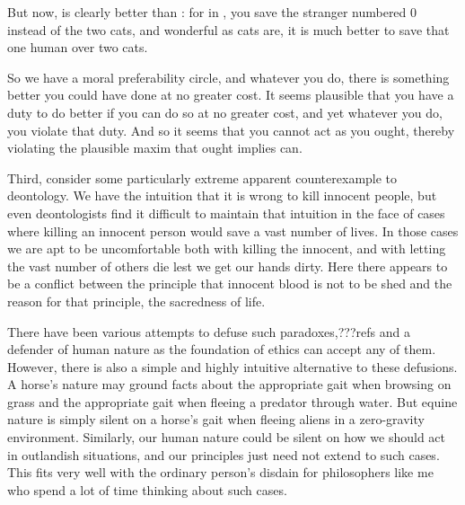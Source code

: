 But now,  is clearly better than : for in , you save the stranger
numbered $0$ instead of the two cats, and wonderful as cats are, it is much better to save that one human over two cats. 

So we have a moral preferability circle, and whatever you do, there is something better you could have
done at no greater cost. It seems plausible that you have a duty to do better if you can do so at no greater
cost, and yet whatever you do, you violate that duty. And so it seems that you cannot act as you ought,
thereby violating the plausible maxim that ought implies can.

Third, consider some particularly extreme apparent counterexample to deontology. We have the intuition that
it is wrong to kill innocent people, but even deontologists find it difficult to maintain that intuition
in the face of cases where killing an innocent person would save a vast number of lives. In those cases
we are apt to be uncomfortable both with killing the innocent, and with letting the vast number of others
die lest we get our hands dirty. Here there appears to be a conflict between the principle 
that innocent blood is not to be shed and the reason for that principle, the sacredness of life. 

There have been various attempts to defuse such paradoxes,???refs and a defender of human nature as the
foundation of ethics can accept any of them. However, there is also a simple and highly intuitive 
alternative to these defusions. A horse's nature may ground facts about the appropriate gait when
browsing on grass and the appropriate gait when fleeing a predator through water. But equine nature
is simply silent on a horse's gait when fleeing aliens in a zero-gravity environment. Similarly,
our human nature could be silent on how we should act in outlandish situations, and our
principles just need not extend to such cases. This fits very well with the ordinary person's
disdain for philosophers like me who spend a lot of time thinking about such cases. 

